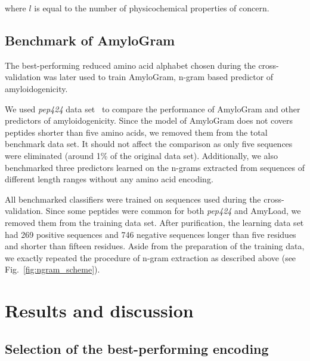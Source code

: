 \documentclass{bioinfo}
\begin{document}
\begin{methods}
where $l$ is equal to the number of physicochemical properties of concern.

\subsection{Benchmark of AmyloGram}

The best-performing reduced amino acid alphabet chosen during the 
cross-validation was later used to train AmyloGram, n-gram based predictor of 
amyloidogenicity.

  We used \textit{pep424} data set~\citep{walsh_pasta_2014} to compare the 
performance of AmyloGram and other predictors of amyloidogenicity. Since the 
model of AmyloGram does not covers peptides shorter than five amino acids, we 
removed them from the total benchmark data set. It should not affect the 
comparison as only five sequences were eliminated (around 1\% of the original 
data set). Additionally, we also benchmarked three predictors learned on the 
n-grams extracted from sequences of different length ranges without any amino 
acid encoding.

  All benchmarked classifiers were trained on sequences used during the 
cross-validation. Since some peptides were common for both \textit{pep424} and 
AmyLoad, we removed them from the training data set. After purification, the 
learning data set had 269 positive sequences and 746 negative sequences longer 
than five residues and shorter than fifteen residues. Aside from the 
preparation of the training data, we exactly repeated the procedure of n-gram 
extraction as described above (see Fig.~\ref{fig:ngram_scheme}). 


\end{methods}

\section{Results and discussion}

\subsection{Selection of the best-performing encoding}
\end{document}

